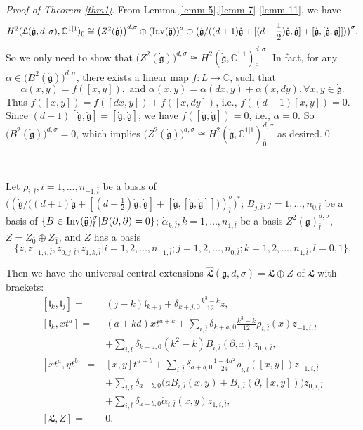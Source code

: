 \documentclass[1p]{elsarticle}
\numberwithin{equation}{section}
\def\dg{\dot{\mathfrak{g}}}
\def\fg{\mathfrak{g}}
\def\fL{\mathfrak{L}}
\def\bC{\mathbb{C}}
\def\Inv{{\rm Inv}}
\def\fl{\mathfrak{l}}
\def\hL{\hat{\fL}}
\begin{document}
{\it Proof of Theorem \ref{thm1}}. From Lemma \ref{lemm-5},\ref{lemm-7}-\ref{lemm-11}, we have $$H^2(\fL(\dg,d,\sigma),\bC^{1|1})_{\bar 0}\cong \big(Z^2(\dg)\big)^{d,\sigma}\oplus {(\Inv(\ddot{\fg}))}^\sigma\oplus \big(\dg/((d+1)\dg+[(d+\frac 12)\dg,\dg]+ [\dg,[\dg,\dg]])\big)^{\sigma}.$$ So we only need to show that $\big(Z^2(\dg)\big)^{d,\sigma}\cong H^2(\dg,\bC^{1|1})_{\bar 0}^{d,\sigma}$.
 In fact, for any $\alpha\in \big(B^2(\dg)\big)^{d,\sigma}$, there exists a linear map $f:L\rightarrow \bC$, such that $$\alpha(x,y)=f([x,y]), \text{ and } \alpha(x,y)=\alpha(dx,y)+\alpha(x,dy),\forall x,y\in \dg.$$ Thus $f([x,y])=f([dx,y])+f([x,dy])$,  i.e., $f((d-1)[x,y])=0$. Since $(d-1)[\dg,\dg]=[\dg,\dg]$, we have $f([\dg,\dg])=0$, i.e., $\alpha=0$. So $\big(B^2(\dg)\big)^{d,\sigma}=0$, which implies $\big(Z^2(\dg)\big)^{d,\sigma}\cong H^2(\dg,\bC^{1|1})_{\bar 0}^{d,\sigma}$ as desired.\qed

\

Let $\rho_{i,\bar{l}},i=1,\ldots,n_{-1,\bar{l}}$ be a basis of $\big((\dg/\big((d+1)\dg+[(d+\frac 12)\dg,\dg]+[\dg,[\dg,\dg]]\big))_{\bar l}^{\sigma}\big)^*$;
$B_{j,\bar{l}},j=1,\ldots,n_{0,\bar l}$ be a basis of $\{B\in {\Inv(\ddot{\fg})}_{\bar l}^\sigma|B(\partial,\partial)=0\}$;  $\dot{\alpha}_{k,\bar{l}},k=1,\ldots,n_{1,\bar{l}}$ be a basis $Z^2(\dg)_{\bar l}^{d,\sigma}$, $Z=Z_{\bar 0}\oplus Z_{\bar 1}$, and $Z$ has a basis $$\{z, z_{-1,i,\bar{l}},z_{0,j,\bar{l}},z_{1,k,\bar{l}}|i=1,2,\ldots, n_{-1,\bar{l}}; j=1,2,\ldots,n_{0,\bar{l}};k=1,2,\ldots, n_{1,\bar{l}},l=0,1\}.$$

Then we have the universal central extensions $\hL(\dg,d,\sigma)=\fL\oplus Z$ of $\fL$ with brackets:
 \begin{equation}\label{hL}\begin{aligned}{ } [\fl_k,\fl_j]=&(j-k)\fl_{k+j}+\delta_{k+j,0}\frac{k^3-k}{12}z,\\
 [\fl_k, xt^a]=& (a+kd)xt^{a+k}+\sum_{i,\bar{l}} \delta_{k+a,0}\frac{k^3-k}{12} \rho_{i,\bar{l}}(x)z_{-1,i,\bar{l}}\\
 &+\sum_{i,\bar{l}}\delta_{k+a,0}(k^2-k) B_{i,\bar{l}}(\partial,x)z_{0,i,\bar{l}},\\
  [xt^a,yt^b]=&[x,y]t^{a+b}+\sum_{i,\bar{l}}\delta_{a+b,0}\frac{1-4a^2}{24}\rho_{i,\bar{l}}([x,y] )z_{-1,i,\bar{l}}\\
  &+\sum_{i,\bar{l}}\delta_{a+b,0} \Big(a B_{i,\bar{l}}(x,y)+B_{i,\bar{l}}(\partial,[x,y])\Big)z_{0,i,\bar{l}}\\
  &+\sum_{i,\bar{l}}\delta_{a+b,0}\dot\alpha_{i,\bar{l}}(x,y)z_{1,i,\bar{l}},\\
  [\fL,Z]=&0.\end{aligned}\end{equation}
\end{document}
